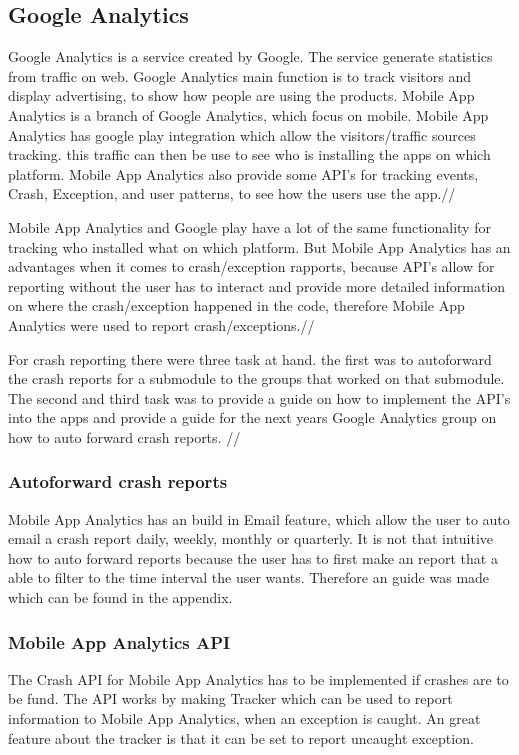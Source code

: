 \subsection{Google Analytics}
Google Analytics is a service created by Google. The service generate statistics from traffic on web. Google Analytics main function is to track visitors and display advertising, to show how people are using the products. Mobile App Analytics is a branch of  Google Analytics, which focus on mobile. Mobile App Analytics has google play integration which allow the visitors/traffic sources tracking. this traffic can then be use to see who is installing the apps on which platform. Mobile App Analytics also provide some API’s for tracking events, Crash, Exception, and user patterns, to see how the users use the app.//

Mobile App Analytics and Google play have a lot of the same functionality for tracking who installed what on which platform. But Mobile App Analytics has an advantages when it comes to crash/exception rapports, because API’s allow for reporting without the user has to interact and provide more detailed information on where the crash/exception happened in the code, therefore Mobile App Analytics were used to report crash/exceptions.//

For crash reporting there were three task at hand. the first was to autoforward the crash reports for a submodule to the groups that worked on that submodule. The second and third task was to provide a guide on how to implement the API’s into the apps and provide a guide for the next years Google Analytics group on how to auto forward crash reports. //

\subsubsection{Autoforward crash reports}
Mobile App Analytics has an build in Email feature, which allow the user to auto email a crash report daily, weekly, monthly or quarterly. It is not that intuitive how to auto forward reports because the user has to first make an report that a able to filter to the time interval the user wants. Therefore an guide was made which can be found in the appendix.

\subsubsection{Mobile App Analytics API}
The Crash API for Mobile App Analytics has to be implemented if crashes are to be fund. The API works by making Tracker which can be used to report information to Mobile App Analytics, when an exception is caught. An great feature about the tracker is that it can be set to report uncaught exception.  